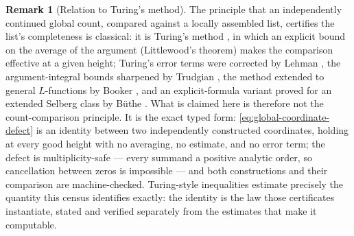 \documentclass[11pt]{article}
\theoremstyle{definition}
\newtheorem{remark}[theorem]{Remark}
\begin{document}
\begin{remark}[Relation to Turing's method]\label{rem:turing-method}
The principle that an independently continued global count, compared
against a locally assembled list, certifies the list's completeness is
classical: it is Turing's method \cite{Turing53}, in which an explicit
bound on the average of the argument (Littlewood's theorem) makes the
comparison effective at a given height; Turing's error terms were
corrected by Lehman \cite{Lehman70}, the argument-integral bounds
sharpened by Trudgian \cite{Trudgian11}, the method extended to general
$L$-functions by Booker \cite{Boo06}, and an explicit-formula variant
proved for an extended Selberg class by B\"uthe \cite{Buethe15}.  What is
claimed here is therefore not the count-comparison principle.  It is the
exact typed form: \eqref{eq:global-coordinate-defect} is an identity
between two independently constructed coordinates, holding at every good
height with no averaging, no estimate, and no error term; the defect is
multiplicity-safe --- every summand a positive analytic order, so
cancellation between zeros is impossible --- and both constructions and
their comparison are machine-checked.  Turing-style inequalities estimate
precisely the quantity this census identifies exactly: the identity is
the law those certificates instantiate, stated and verified separately
from the estimates that make it computable.
\end{remark}
\end{document}
